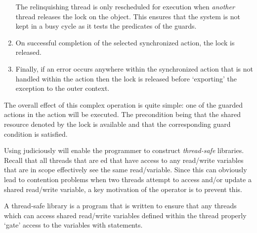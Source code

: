 \begin{enumerate}
The relinquishing thread is only rescheduled for execution when \emph{another} thread releases the lock on the object. This ensures that the system is not kept in a busy cycle as it tests the predicates of the guards.

\item \label{stepX}
On successful completion of the selected synchronized action, the lock is released.
\item 
Finally, if an error occurs anywhere within the synchronized action that is not handled within the action then the lock is released before `exporting' the exception to the outer context.
\end{enumerate}

The overall effect of this complex operation is quite simple: one of the guarded actions in the  action will be executed. The precondition being that the shared resource denoted by the lock is available and that the corresponding guard condition is satisfied.

\begin{aside}[Hint]
Using  judiciously will enable the programmer to construct \emph{thread-safe} libraries. Recall that all threads that are ed that have access to any read/write variables that are in scope effectively see the same read/variable. Since this can obviously lead to contention problems when two threads attempt to access and/or update a shared read/write variable, a key motivation of the  operator is to prevent this.

A thread-safe library is a program that is written to ensure that any threads which can access shared read/write variables defined within the thread properly `gate' access to the variables with  statements.
\end{aside}

